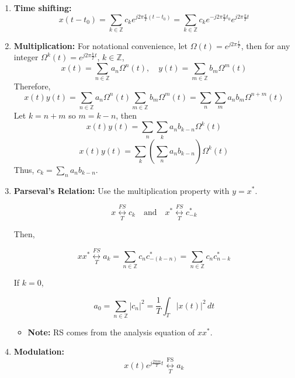 \begin{derivation}
\begin{enumerate}
        \item \textbf{Time shifting:}
        \[
        x(t - t_0) = \sum_{k \in \mathbb{Z}} c_k e^{j 2\pi \frac{k}{T} (t - t_0)} = \sum_{k \in \mathbb{Z}} c_k e^{-j 2\pi \frac{k}{T} t_0} e^{j 2\pi \frac{k}{T} t}
        \]

        \item \textbf{Multiplication:} For notational convenience, let \( \Omega(t) = e^{j 2\pi \frac{t}{T}} \), then for any integer \( \Omega^k(t) = e^{j 2\pi \frac{k}{T} t} \), \( k \in \mathbb{Z} \),
        \[
        x(t) = \sum_{n \in \mathbb{Z}} a_n \Omega^n(t), \quad y(t) = \sum_{m \in \mathbb{Z}} b_m \Omega^m(t)
        \]
        Therefore, 
        \[
        x(t) y(t) = \sum_{n \in \mathbb{Z}} a_n \Omega^n(t) \sum_{m \in \mathbb{Z}} b_m \Omega^m(t) = \sum_n \sum_m a_n b_m \Omega^{n+m}(t)
        \]
        Let \( k = n + m \) so $m=k-n$, then 
        \begin{equation*}
            x(t) y(t) = \sum_n \sum_k a_n b_{k-n} \Omega^k(t)
        \end{equation*}
        \[
        x(t) y(t) = \sum_k \left( \sum_n a_n b_{k-n} \right) \Omega^k(t)
        \]
        Thus, \( c_k = \sum_n a_n b_{k-n} \).

        \item \textbf{Parseval's Relation:} Use the multiplication property with \( y = x^* \).

        \[
        x \underset{T}{\overset{FS}{\longleftrightarrow}} c_k \quad \text{and} \quad x^* \underset{T}{\overset{FS}{\longleftrightarrow}} c_{-k}^*
        \]
        
        Then, 
        
        \[
        x x^* \underset{T}{\overset{FS}{\longleftrightarrow}} a_k =  \sum_{n \in \mathbb{Z}} c_n c_{-(k-n)}^* = \sum_{n \in \mathbb{Z}} c_n c_{n-k}^*
        \]

        If \( k = 0 \),

        \[
        a_0 = \sum_{n \in \mathbb{Z}} |c_n|^2 = \frac{1}{T} \int_{T} |x(t)|^2 \, dt
        \]
        \begin{itemize}
            \item \textbf{Note:} RS comes from the analysis equation of $x x^*$.
        \end{itemize}

        \item \textbf{Modulation:}  \[
            x(t)e^{j\frac{2\pi m}{T}t} \underset{T}{\overset{\text{FS}}{\longleftrightarrow}} a_k
            \]
            

\end{enumerate}
\end{derivation}
